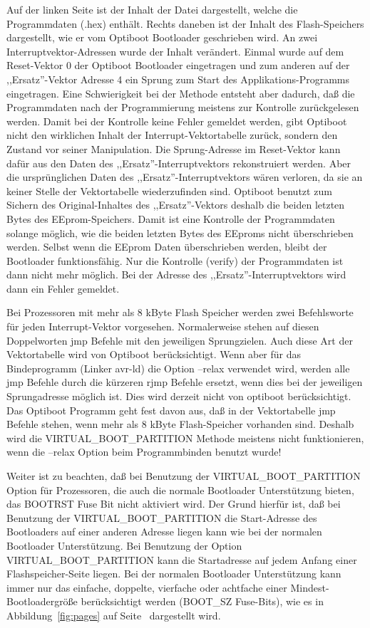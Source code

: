 Auf der linken Seite ist der Inhalt der Datei dargestellt, welche die Programmdaten (.hex) enthält.
Rechts daneben ist der Inhalt des Flash-Speichers dargestellt, wie er vom Optiboot Bootloader
geschrieben wird. An zwei Interruptvektor-Adressen wurde der Inhalt verändert.
Einmal wurde auf dem Reset-Vektor 0 der Optiboot Bootloader eingetragen und zum anderen
auf der ,,Ersatz''-Vektor Adresse 4 ein Sprung zum Start des Applikations-Programms eingetragen. 
Eine Schwierigkeit bei der Methode entsteht aber dadurch, daß die Programmdaten nach
der Programmierung meistens zur Kontrolle zurückgelesen werden.
Damit bei der Kontrolle keine Fehler gemeldet werden, gibt Optiboot nicht den wirklichen Inhalt
der Interrupt-Vektortabelle zurück, sondern den Zustand vor seiner Manipulation.
Die Sprung-Adresse im Reset-Vektor kann dafür aus den Daten des ,,Ersatz''-Interruptvektors rekonstruiert werden.
Aber die ursprünglichen Daten des ,,Ersatz''-Interruptvektors wären verloren, da sie an keiner
Stelle der Vektortabelle wiederzufinden sind.
Optiboot benutzt zum Sichern des Original-Inhaltes des ,,Ersatz''-Vektors deshalb die beiden letzten
Bytes des EEprom-Speichers.
Damit ist eine Kontrolle der Programmdaten solange möglich, wie die beiden letzten Bytes
des EEproms nicht überschrieben werden.
Selbst wenn die EEprom Daten überschrieben werden, bleibt der Bootloader funktionsfähig.
Nur die Kontrolle (verify) der Programmdaten ist dann nicht mehr möglich. Bei der Adresse
des ,,Ersatz''-Interruptvektors wird dann ein Fehler gemeldet.

Bei Prozessoren mit mehr als 8 kByte Flash Speicher werden zwei Befehlsworte für jeden Interrupt-Vektor
vorgesehen. Normalerweise stehen auf diesen Doppelworten jmp Befehle mit den jeweiligen Sprungzielen.
Auch diese Art der Vektortabelle wird von Optiboot berücksichtigt. Wenn aber für das Bindeprogramm
(Linker avr-ld) die Option --relax verwendet wird,
werden alle jmp Befehle durch die kürzeren rjmp Befehle ersetzt,
wenn dies bei der jeweiligen Sprungadresse möglich ist.
Dies wird derzeit nicht von optiboot berücksichtigt.
Das Optiboot Programm geht fest davon aus, daß in der Vektortabelle jmp Befehle stehen,
wenn mehr als 8 kByte Flash-Speicher vorhanden sind.
Deshalb wird die VIRTUAL\_BOOT\_PARTITION Methode meistens nicht funktionieren, wenn die --relax Option
beim Programmbinden benutzt wurde!


Weiter ist zu beachten, daß bei Benutzung der VIRTUAL\_BOOT\_PARTITION Option für Prozessoren, die auch
die normale Bootloader Unterstützung bieten, das BOOTRST Fuse Bit nicht aktiviert wird.
Der Grund hierfür ist, daß bei Benutzung der VIRTUAL\_BOOT\_PARTITION die Start-Adresse des Bootloaders
auf einer anderen Adresse liegen kann wie bei der normalen Bootloader Unterstützung.
Bei Benutzung der Option VIRTUAL\_BOOT\_PARTITION kann die Startadresse auf jedem Anfang einer
Flashspeicher-Seite liegen. Bei der normalen Bootloader Unterstützung kann immer nur das
einfache, doppelte, vierfache oder achtfache einer Mindest-Bootloadergröße berücksichtigt
werden (BOOT\_SZ Fuse-Bits), wie es in Abbildung~\ref{fig:pages} auf Seite~\pageref{fig:pages}
dargestellt wird.

